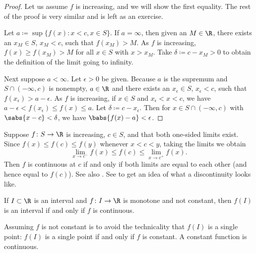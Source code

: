 \begin{proof}
Let us assume $f$ is increasing, and we will show the first
equality.  The rest of the proof is very similar and is left as an
exercise.

Let $a \coloneqq \sup \{ f(x) : x < c, x \in S \}$.  If $a = \infty$,
then given an $M \in \R$, there exists an $x_M \in S$, $x_M < c$, such that $f(x_M) > M$. 
As $f$ is increasing, $f(x) \geq f(x_M) >  M$ for all $x \in S$ with $x > x_M$.
Take $\delta \coloneqq c-x_M > 0$ to obtain the definition of the limit going to
infinity.

Next suppose $a < \infty$.
Let $\epsilon > 0$ be given.  Because $a$ is the supremum and
$S \cap (-\infty,c)$ is nonempty, $a \in \R$ and
there exists an
$x_\epsilon \in S$,
$x_\epsilon < c$,
such that $f(x_\epsilon) > a-\epsilon$.  As $f$ is increasing,
if $x \in S$ and $x_\epsilon < x < c$, we have
$a-\epsilon < f(x_\epsilon) \leq f(x) \leq a$.  Let
$\delta \coloneqq c-x_\epsilon$.  Then for $x \in S \cap (-\infty,c)$
with $\sabs{x-c} < \delta$,
we have $\babs{f(x)-a} < \epsilon$.
\end{proof}

Suppose $f \colon S \to \R$ is increasing, $c \in S$, and
that both one-sided limits exist.
Since $f(x) \leq f(c) \leq f(y)$
whenever $x < c < y$, taking the limits we obtain
\begin{equation*}
\lim_{x \to c^-} f(x) \leq f(c) \leq \lim_{x \to c^+} f(x) .
\end{equation*}
Then $f$ is continuous at $c$ if and only if both limits are equal
to each other (and hence equal to $f(c)$).  See also
.
See  to get an idea of what a discontinuity
looks like.


\begin{cor} \label{cor:continterval}
If $I \subset \R$ is an interval and $f \colon I \to \R$ is 
monotone and not constant, then $f(I)$ is an interval if and only if $f$
is continuous.
\end{cor}

Assuming $f$ is not constant is to avoid the technicality
that $f(I)$ is a single point: $f(I)$ is a single
point if and only if $f$ is constant.  A constant function is 
continuous.

